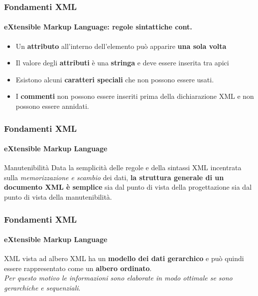 \begin{frame}
	\frametitle{Fondamenti XML}
	\framesubtitle{eXtensible Markup Language: regole sintattiche cont.}
	\addtocounter{nframe}{1}

	\begin{itemize}
		\item Un \textbf{attributo} all'interno dell'elemento può apparire \textbf{una sola volta}
		
		\item Il valore degli \textbf{attributi} è una \textbf{stringa} e deve essere inserita tra apici

		\item Esistono alcuni \textbf{caratteri speciali} che non possono essere usati. 

		\item I \textbf{commenti} non possono essere inseriti prima della dichiarazione XML e non possono essere annidati.

	\end{itemize}

\end{frame}

\begin{frame}
	\frametitle{Fondamenti XML}
	\framesubtitle{eXtensible Markup Language}
	\addtocounter{nframe}{1}

	\begin{block}{Manutenibilità}
		Data la semplicità delle regole e della sintassi XML incentrata sulla \textit{memorizzazione e scambio} dei dati, \textbf{la struttura generale di un documento XML è semplice} sia dal punto di vista della progettazione sia dal punto di vista della manutenibilità.
	\end{block}

\end{frame}

\begin{frame}
	\frametitle{Fondamenti XML}
	\framesubtitle{eXtensible Markup Language}
	\addtocounter{nframe}{1}

	\begin{block}{XML vista ad albero}
		XML ha un \textbf{modello dei dati gerarchico} e può quindi essere rappresentato come un \textbf{albero ordinato}.
		\\\textit{Per questo motivo le informazioni sono elaborate in modo ottimale se sono gerarchiche e sequenziali}.
	\end{block}

\end{frame}


